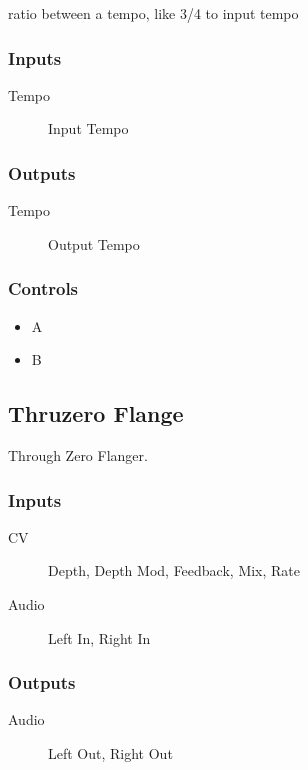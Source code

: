 ratio between a tempo, like 3/4 to input tempo



\subsubsection{Inputs}
\begin{description}
\item [Tempo] Input Tempo
\end{description}

\subsubsection{Outputs}
\begin{description}
\item [Tempo] Output Tempo
\end{description}

\subsubsection{Controls}
\begin{itemize}
\item A
\item B
\end{itemize}

\subsection{Thruzero Flange}

Through Zero Flanger.



\subsubsection{Inputs}
\begin{description}
\item [CV] Depth, Depth Mod, Feedback, Mix, Rate
\item [Audio] Left In, Right In
\end{description}

\subsubsection{Outputs}
\begin{description}
\item [Audio] Left Out, Right Out
\end{description}

